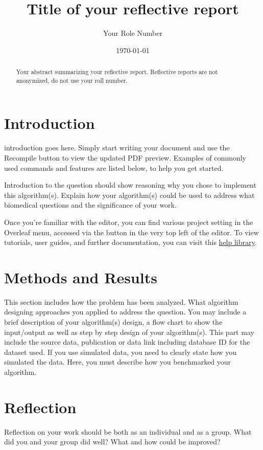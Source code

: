 \documentclass{IEEEtran}
\title{Title of your reflective report}
\author{Your Role Number}
\date{\today}
\begin{document}
\maketitle
\begin{abstract}
    Your abstract summarizing your reflective report. Reflective reports are not anonymized, do not use your roll number.
\end{abstract}

\section{Introduction}

 introduction goes here. Simply start writing your document and use the Recompile button to view the updated PDF preview. Examples of commonly used commands and features are listed below, to help you get started.

Introduction to the question should show reasoning why you chose to implement this algorithm(s). Explain how your algorithm(s) could be used to address what biomedical questions and the significance of your work. 

Once you're familiar with the editor, you can find various project setting in the Overleaf menu, accessed via the button in the very top left of the editor. To view tutorials, user guides, and further documentation, you can visit this \href{https://www.overleaf.com/learn}{help library}.

\section{Methods and Results}

This section includes how the problem has been analyzed. What algorithm designing approaches you applied to address the question. You may include a brief description of your algorithm(s) design, a flow chart to show the input/output as well as step by step design of your algorithm(s). This part may include the source data, publication or data link including database ID for the dataset used. If you use simulated data, you need to clearly state how you simulated the data. Here, you must describe how you benchmarked your algorithm.

\section{Reflection}

Reflection on your work should be both as an individual and as a group. What did you and your group did well? What and how could be improved?
\end{document}
